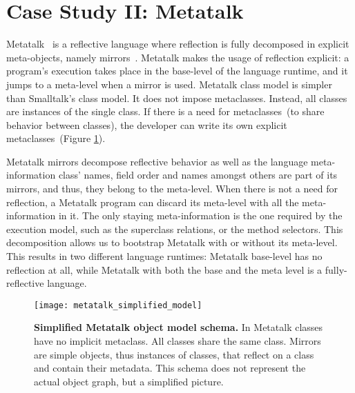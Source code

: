
\section{Case Study II: Metatalk} \label{sec:bootstrap_metatalk}

Metatalk~\cite{Papo11a} is a reflective language where reflection is fully decomposed in explicit meta-objects, namely mirrors~\cite{Brac04b}. Metatalk makes the usage of reflection explicit: a program's execution takes place in the base-level of the language runtime, and it jumps to a meta-level when a mirror is used. Metatalk class model is simpler than Smalltalk's class model. It does not impose metaclasses. Instead, all classes are instances of the single  class. If there is a need for metaclasses~(to share behavior between classes), the developer can write its own explicit metaclasses~(Figure \ref{fig:metatalk_simplified_model}).

Metatalk mirrors decompose reflective behavior as well as the language meta-information \ie class' names, field order and names amongst others are part of its mirrors, and thus, they belong to the meta-level. When there is not a need for reflection, a Metatalk program can discard its meta-level with all the meta-information in it. The only staying meta-information is the one required by the \VMs execution model, such as the superclass relations, or the method selectors. This decomposition allows us to bootstrap Metatalk with or without its meta-level. This results in two different language runtimes: Metatalk base-level has no reflection at all, while Metatalk with both the base and the meta level is a fully-reflective language.

\begin{figure}[ht]
\center
\texttt{[image: metatalk\_simplified\_model]}
\caption{\textbf{Simplified Metatalk object model schema.} In Metatalk classes have no implicit metaclass. All classes share the same class. Mirrors are simple objects, thus instances of classes, that reflect on a class and contain their metadata. This schema does not represent the actual object graph, but a simplified picture.\label{fig:metatalk_simplified_model}}
\end{figure}

